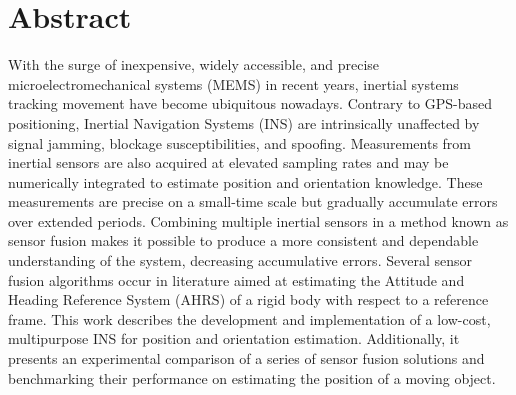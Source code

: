 \chapter*{Abstract}
\justify
With the surge of inexpensive, widely accessible, and precise microelectromechanical systems (MEMS) in recent years, inertial systems tracking movement have become ubiquitous nowadays. Contrary to GPS-based positioning, Inertial Navigation Systems (INS) are intrinsically unaffected by signal jamming, blockage susceptibilities, and spoofing. Measurements from inertial sensors are also acquired at elevated sampling rates and may be numerically integrated to estimate position and orientation knowledge. These measurements are precise on a small-time scale but gradually accumulate errors over extended periods. Combining multiple inertial sensors in a method known as sensor fusion makes it possible to produce a more consistent and dependable understanding of the system, decreasing accumulative errors. Several sensor fusion algorithms occur in literature aimed at estimating the Attitude and Heading Reference System (AHRS) of a rigid body with respect to a reference frame. This work describes the development and implementation of a low-cost, multipurpose INS for position and orientation estimation. Additionally, it presents an experimental comparison of a series of sensor fusion solutions and benchmarking their performance on estimating the position of a moving object.

